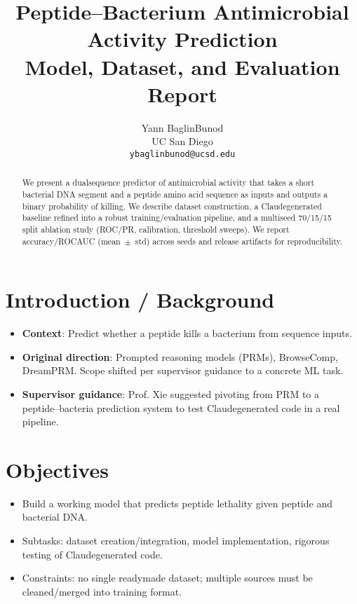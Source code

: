 \documentclass{article}
\title{Peptide--Bacterium Antimicrobial Activity Prediction\\Model, Dataset, and Evaluation Report}
\author{Yann Baglin\-Bunod \\
UC San Diego \\
\texttt{ybaglinbunod@ucsd.edu}}
\begin{document}
\maketitle

\begin{abstract}
We present a dual\-sequence predictor of antimicrobial activity that takes a short bacterial DNA segment and a peptide amino acid sequence as inputs and outputs a binary probability of killing. We describe dataset construction, a Claude\-generated baseline refined into a robust training/evaluation pipeline, and a multi\-seed 70/15/15 split ablation study (ROC/PR, calibration, threshold sweeps). We report accuracy/ROC\-AUC (mean~$\pm$~std) across seeds and release artifacts for reproducibility.
\end{abstract}


\section{Introduction / Background}
\begin{itemize}[leftmargin=*,nosep]
  \item \textbf{Context}: Predict whether a peptide kills a bacterium from sequence inputs.
  \item \textbf{Original direction}: Prompted reasoning models (PRMs), BrowseComp, DreamPRM. Scope shifted per supervisor guidance to a concrete ML task.
  \item \textbf{Supervisor guidance}: Prof. Xie suggested pivoting from PRM to a peptide--bacteria prediction system to test Claude\-generated code in a real pipeline.
\end{itemize}

\section{Objectives}
\begin{itemize}[leftmargin=*,nosep]
  \item Build a working model that predicts peptide lethality given peptide and bacterial DNA.
  \item Subtasks: dataset creation/integration, model implementation, rigorous testing of Claude\-generated code.
  \item Constraints: no single ready\-made dataset; multiple sources must be cleaned/merged into training format.
\end{itemize}
\end{document}
